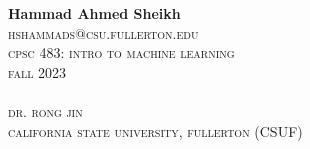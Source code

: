 \documentclass[twocolumn,10pt]{article}
\begin{document}
\onecolumn
\\~\\

\textbf{Hammad Ahmed Sheikh}\\
\textsc{hshammads@csu.fullerton.edu}\\
\textsc{cpsc 483: intro to machine learning}\\
\textsc{fall 2023}\\~\\

\textsc{dr. rong jin}\\
\textsc{california state university, fullerton (CSUF)}\\~\\
\end{document}
